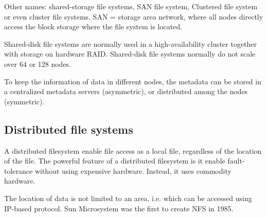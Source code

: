 Other names: shared-storage file systems, SAN file system, Clustered file system
or even cluster file systems. SAN = storage area network, where all nodes
directly access the block storage where the file system is located. 

Shared-disk file systems are normally used in a high-availability cluster
together with storage on hardware RAID. Shared-disk file systems normally do not
scale over 64 or 128 nodes. 

To keep the information of data in different nodes, the metadata can be stored 
in a centralized metadata servers (asymmetric), or distributed among the nodes
(symmetric).

\subsection{Distributed file systems}
\label{sec:distributed_filesystem}
\label{sec:filesystem-scalable-distributed}


A distributed filesystem enable file access as a local file, regardless of the
location of the file. The powerful feature of a distributed filesystem is it
enable fault-tolerance without using expensive hardware. Instead, it uses
commodity hardware.


The location of data is not limited to an area, i.e. which can be accessed using
IP-based protocol. Sun Microsystem was the first to create NFS in 1985.

